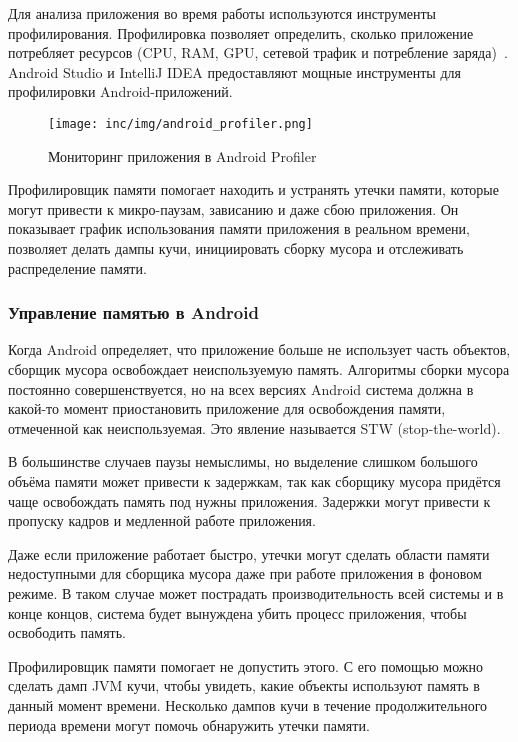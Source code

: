 Для анализа приложения во время работы используются инструменты профилирования.
Профилировка позволяет определить, сколько приложение потребляет ресурсов (CPU, RAM, GPU, сетевой трафик и потребление заряда)~\cite{android:profile}.
Android Studio и IntelliJ IDEA предоставляют мощные инструменты для профилировки Android-приложений.

\begin{figure}[ht]
  \texttt{[image: inc/img/android\_profiler.png]}
  \caption{Мониторинг приложения в Android Profiler}
  \label{fig:profiler}
\end{figure}

Профилировщик памяти помогает находить и устранять утечки памяти, которые могут привести к микро-паузам, зависанию и даже сбою приложения.
Он показывает график использования памяти приложения в реальном времени, позволяет делать дампы кучи, инициировать сборку мусора и отслеживать распределение памяти.

\subsubsection*{Управление памятью в Android}

Когда Android определяет, что приложение больше не использует часть объектов, сборщик мусора освобождает неиспользуемую память.
Алгоритмы сборки мусора постоянно совершенствуется, но на всех версиях Android система должна в какой-то момент приостановить приложение для освобождения памяти, отмеченной как неиспользуемая.
Это явление называется STW (stop-the-world).

В большинстве случаев паузы немыслимы, но выделение слишком большого объёма памяти может привести к задержкам, так как сборщику мусора придётся чаще освобождать память под нужны приложения.
Задержки могут привести к пропуску кадров и медленной работе приложения.

Даже если приложение работает быстро, утечки могут сделать области памяти недоступными для сборщика мусора даже при работе приложения в фоновом режиме.
В таком случае может пострадать производительность всей системы и в конце концов, система будет вынуждена убить процесс приложения, чтобы освободить память.

Профилировщик памяти помогает не допустить этого.
С его помощью можно сделать дамп JVM кучи, чтобы увидеть, какие объекты используют память в данный момент времени.
Несколько дампов кучи в течение продолжительного периода времени могут помочь обнаружить утечки памяти.

\conclusions
\label{sec:techConclusions}

